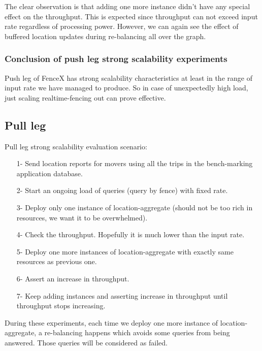 \documentclass[a4]{report}
\begin{document}
    \clearpage
    The clear observation is that adding one more instance didn't have any special effect on the throughput.
    This is expected since throughput can not exceed input rate regardless of processing power.
    However, we can again see the effect of buffered location updates during re-balancing all over the graph.

    \subsubsection{Conclusion of push leg strong scalability experiments}
    Push leg of FenceX has strong scalability characteristics at least in the range of input rate we have managed to produce.
    So in case of unexpectedly high load, just scaling realtime-fencing out can prove effective.

    \subsection{Pull leg}
    Pull leg strong scalability evaluation scenario:
    \begin{itemize}
        \item[1-] Send location reports for movers using all the trips in the bench-marking application database.
        \item[2-] Start an ongoing load of queries (query by fence) with fixed rate.
        \item[3-] Deploy only one instance of location-aggregate (should not be too rich in resources, we want it to be
        overwhelmed).
        \item[4-] Check the throughput. Hopefully it is much lower than the input rate.
        \item[5-] Deploy one more instances of location-aggregate with exactly same resources as previous one.
        \item[6-] Assert an increase in throughput.
        \item[7-] Keep adding instances and asserting increase in throughput until throughput stops increasing.
    \end{itemize}

    During these experiments, each time we deploy one more instance of location-aggregate, a re-balancing happens which
    avoids some queries from being answered.
    Those queries will be considered as failed.
\end{document}
